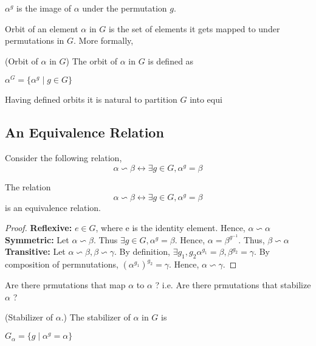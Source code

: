 \begin{notation} $\alpha^g$ is the image of $\alpha$ under the permutation $g$. 
\end{notation}

Orbit of an element $\alpha$ in $G$ is the set of elements it gets mapped to under permutations in $G$. More formally,

\begin{definition}(Orbit of $\alpha$ in $G$)
The orbit of $\alpha$ in $G$ is defined as
\begin{center}
$\alpha^G = \{\alpha^g \mid g \in G\}$
\end{center}
\end{definition}

Having defined orbits it is natural to partition $G$ into equi



\subsection{An Equivalence Relation}
Consider the following relation,
\[\alpha \backsim \beta \leftrightarrow \exists g \in G, \alpha^g = \beta\]

\begin{claim}
The relation 
\[\alpha \backsim \beta \leftrightarrow \exists g \in G, \alpha^g = \beta\]
is an equivalence relation. 
\end{claim}
\begin{proof}
\textbf{Reflexive:} $e \in G$, where e is the identity element. Hence, $\alpha \backsim \alpha$ \\
\textbf{Symmetric:} Let $\alpha \backsim \beta$. Thus $\exists g \in G, \alpha^g = \beta$. Hence, $\alpha = \beta^{g^{-1}}$. Thus, $\beta \backsim \alpha$ \\
\textbf{Transitive:} Let $\alpha \backsim \beta, \beta \backsim \gamma$. By definition, $\exists g_1, g_2 \alpha^{g_1} = \beta, \beta^{g_2} = \gamma$. By composition of permnutations, $(\alpha^{g_1})^{g_2} = \gamma$. Hence, $\alpha \backsim \gamma$.
\end{proof}

Are there prmutations that map $\alpha$ to $\alpha$ ? i.e. Are there prmutations that stabilize $\alpha$ ?


\begin{definition}(Stabilizer of $\alpha$.)
The stabilizer of $\alpha$ in $G$ is 
\begin{center}
$G_{\alpha} = \{g \mid \alpha^g = \alpha\}$
\end{center}
\end{definition}

